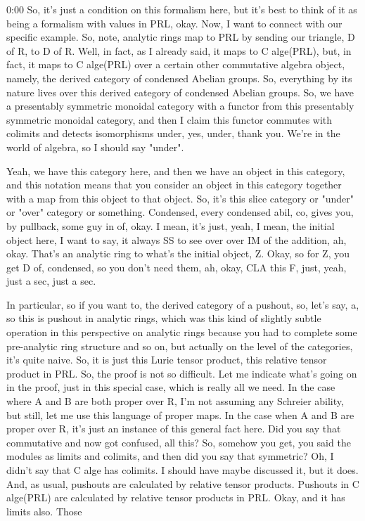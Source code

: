 \begin{unfinished}{0:00}
So, it's just a condition on this formalism here, but it's best to think of it as being a formalism with values in PRL, okay. Now, I want to connect with our specific example. So, note, analytic rings map to PRL by sending our triangle, D of R, to D of R. Well, in fact, as I already said, it maps to C alge(PRL), but, in fact, it maps to C alge(PRL) over a certain other commutative algebra object, namely, the derived category of condensed Abelian groups. So, everything by its nature lives over this derived category of condensed Abelian groups. So, we have a presentably symmetric monoidal category with a functor from this presentably symmetric monoidal category, and then I claim this functor commutes with colimits and detects isomorphisms under, yes, under, thank you. We're in the world of algebra, so I should say "under".

Yeah, we have this category here, and then we have an object in this category, and this notation means that you consider an object in this category together with a map from this object to that object. So, it's this slice category or "under" or "over" category or something. Condensed, every condensed abil, co, gives you, by pullback, some guy in of, okay. I mean, it's just, yeah, I mean, the initial object here, I want to say, it always SS to see over over IM of the addition, ah, okay. That's an analytic ring to what's the initial object, Z. Okay, so for Z, you get D of, condensed, so you don't need them, ah, okay, CLA this F, just, yeah, just a sec, just a sec.

In particular, so if you want to, the derived category of a pushout, so, let's say, a, so this is pushout in analytic rings, which was this kind of slightly subtle operation in this perspective on analytic rings because you had to complete some pre-analytic ring structure and so on, but actually on the level of the categories, it's quite naive. So, it is just this Lurie tensor product, this relative tensor product in PRL. So, the proof is not so difficult. Let me indicate what's going on in the proof, just in this special case, which is really all we need. In the case where A and B are both proper over R, I'm not assuming any Schreier ability, but still, let me use this language of proper maps. In the case when A and B are proper over R, it's just an instance of this general fact here. Did you say that commutative and now got confused, all this? So, somehow you get, you said the modules as limits and colimits, and then did you say that symmetric? Oh, I didn't say that C alge has colimits. I should have maybe discussed it, but it does. And, as usual, pushouts are calculated by relative tensor products. Pushouts in C alge(PRL) are calculated by relative tensor products in PRL. Okay, and it has limits also. Those



\end{unfinished}

